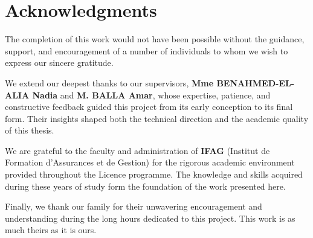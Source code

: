 
{}
\chapter*{Acknowledgments}

The completion of this work would not have been possible without the guidance, support, and encouragement of a number of individuals to whom we wish to express our sincere gratitude.

We extend our deepest thanks to our supervisors, \textbf{Mme BENAHMED-EL-ALIA Nadia} and \textbf{M. BALLA Amar}, whose expertise, patience, and constructive feedback guided this project from its early conception to its final form. Their insights shaped both the technical direction and the academic quality of this thesis.

{\sloppy We are grateful to the faculty and administration of \textbf{IFAG} (Institut de Formation d'Assurances et de Gestion) for the rigorous academic environment provided throughout the Licence programme. The knowledge and skills acquired during these years of study form the foundation of the work presented here.\par}

Finally, we thank our family for their unwavering encouragement and understanding during the long hours dedicated to this project. This work is as much theirs as it is ours.
